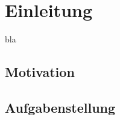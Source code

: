 \chapter[Einleitung]{Einleitung}\label{sec:einleitung}
bla
\section[Motivation]{Motivation}\label{sec:motivation}

\section[Aufgabenstellung]{Aufgabenstellung}\label{sec:aufgabenstellung}
